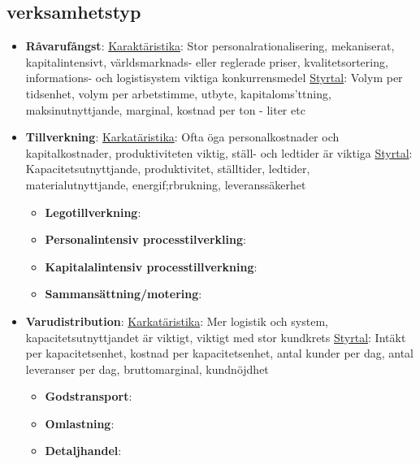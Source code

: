 \subsection{verksamhetstyp}
\begin{itemize}
    \item \textbf{Råvarufångst}: \newline
    \underline{Karaktäristika}: \newline
    Stor personalrationalisering, mekaniserat, kapitalintensivt, världsmarknads- eller reglerade priser, kvalitetsortering, informations- och logistisystem viktiga konkurrensmedel \newline
    \underline{Styrtal}: \newline
    Volym per tidsenhet, volym per arbetstimme, utbyte, kapitaloms'ttning, maksinutnyttjande, marginal, kostnad per ton - liter etc
    \item \textbf{Tillverkning}:
    \underline{Karkatäristika}: \newline
    Ofta öga personalkostnader och kapitalkostnader, produktiviteten viktig, ställ- och ledtider är viktiga \newline
    \underline{Styrtal}: \newline
    Kapacitetsutnyttjande, produktivitet, ställtider, ledtider, materialutnyttjande, energif;rbrukning, leveranssäkerhet
    \begin{itemize}
        \item \textbf{Legotillverkning}:
        \item \textbf{Personalintensiv processtilverkling}:
        \item \textbf{Kapitalalintensiv processtillverkning}:
        \item \textbf{Sammansättning/motering}:
    \end{itemize}
    \item \textbf{Varudistribution}:
    \underline{Karkatäristika}: \newline
    Mer logistik och system, kapacitetsutnyttjandet är viktigt, viktigt med stor kundkrets \newline
    \underline{Styrtal}: \newline
    Intäkt per kapacitetsenhet, kostnad per kapacitetsenhet, antal kunder per dag, antal leveranser per dag, bruttomarginal, kundnöjdhet
    \begin{itemize}
        \item \textbf{Godstransport}:
        \item \textbf{Omlastning}:
        \item \textbf{Detaljhandel}:

\end{itemize}
\end{itemize}
